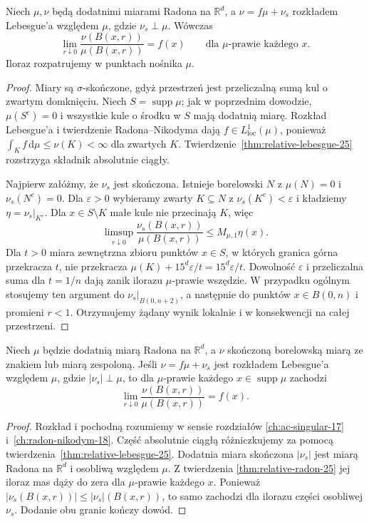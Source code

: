 \begin{twierdzenie}
\label{thm:relative-radon-25}
Niech $\mu,\nu$ będą dodatnimi miarami Radona na $\mathbb R^d$,
a $\nu=f\mu+\nu_s$ rozkładem Lebesgue'a względem $\mu$,
gdzie $\nu_s\perp\mu$. Wówczas
\[
 \lim_{r\downarrow0}\frac{\nu(B(x,r))}{\mu(B(x,r))}
 =f(x)\qquad\text{dla }\mu\text{-prawie każdego }x.
\]
Iloraz rozpatrujemy w punktach nośnika $\mu$.
\end{twierdzenie}
\begin{proof}
Miary są $\sigma$-skończone, gdyż przestrzeń jest
przeliczalną sumą kul o zwartym domknięciu.
Niech $S=\operatorname{supp}\mu$; jak w poprzednim dowodzie,
$\mu(S^c)=0$ i wszystkie kule o środku w $S$ mają dodatnią miarę.
Rozkład Lebesgue'a i twierdzenie Radona--Nikodyma
dają $f\in L^1_{\mathrm{loc}}(\mu)$, ponieważ
$\int_K f\,\mathrm d\mu\le\nu(K)<\infty$ dla zwartych $K$.
Twierdzenie~\ref{thm:relative-lebesgue-25} rozstrzyga
składnik absolutnie ciągły.

Najpierw załóżmy, że $\nu_s$ jest skończona.
Istnieje borelowski $N$ z $\mu(N)=0$ i $\nu_s(N^c)=0$.
Dla $\varepsilon>0$ wybieramy zwarty $K\subseteq N$
z $\nu_s(K^c)<\varepsilon$ i kładziemy
$\eta=\nu_s|_{K^c}$. Dla $x\in S\setminus K$ małe kule
nie przecinają $K$, więc
\[
 \limsup_{r\downarrow0}\frac{\nu_s(B(x,r))}{\mu(B(x,r))}
 \le M_{\mu,1}\eta(x).
\]
Dla $t>0$ miara zewnętrzna zbioru punktów $x\in S$,
w których granica górna przekracza $t$, nie przekracza
$\mu(K)+15^d\varepsilon/t=15^d\varepsilon/t$.
Dowolność $\varepsilon$ i przeliczalna suma dla $t=1/n$
dają zanik ilorazu $\mu$-prawie wszędzie.
W przypadku ogólnym stosujemy ten argument do
$\nu_s|_{B(0,n+2)}$, a następnie do punktów $x\in B(0,n)$
i promieni $r<1$. Otrzymujemy żądany wynik lokalnie
i w konsekwencji na całej przestrzeni.
\end{proof}

\begin{wniosek}
\label{cor:relative-signed-25}
Niech $\mu$ będzie dodatnią miarą Radona na $\mathbb R^d$,
a $\nu$ skończoną borelowską miarą ze znakiem lub miarą
zespoloną. Jeśli $\nu=f\mu+\nu_s$ jest rozkładem
Lebesgue'a względem $\mu$, gdzie $|\nu_s|\perp\mu$,
to dla $\mu$-prawie każdego $x\in\operatorname{supp}\mu$
zachodzi
\[
 \lim_{r\downarrow0}\frac{\nu(B(x,r))}{\mu(B(x,r))}
 =f(x).
\]
\end{wniosek}
\begin{proof}
Rozkład i pochodną rozumiemy w sensie rozdziałów
\ref{ch:ac-singular-17} i~\ref{ch:radon-nikodym-18}.
Część absolutnie ciągłą różniczkujemy za pomocą
twierdzenia~\ref{thm:relative-lebesgue-25}.
Dodatnia miara skończona $|\nu_s|$ jest miarą Radona
na $\mathbb R^d$ i osobliwą względem $\mu$. Z twierdzenia
\ref{thm:relative-radon-25} jej iloraz mas dąży do zera
dla $\mu$-prawie każdego $x$. Ponieważ
$|\nu_s(B(x,r))|\le|\nu_s|(B(x,r))$, to samo zachodzi
dla ilorazu części osobliwej $\nu_s$. Dodanie obu granic
kończy dowód.
\end{proof}

